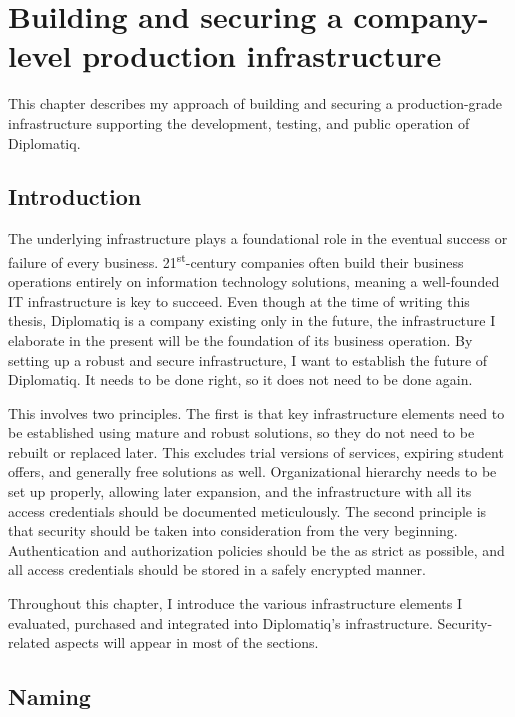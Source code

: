 \chapter{Building and securing a company-level production infrastructure}
\label{chapter:infrastructure}

This chapter describes my approach of building and securing a production-grade infrastructure supporting the development, testing, and public operation of Diplomatiq.

\section{Introduction}

The underlying infrastructure plays a foundational role in the eventual success or failure of every business. 21\textsuperscript{st}-century companies often build their business operations entirely on information technology solutions, meaning a well-founded IT infrastructure is key to succeed. Even though at the time of writing this thesis, Diplomatiq is a company existing only in the future, the infrastructure I elaborate in the present will be the foundation of its business operation. By setting up a robust and secure infrastructure, I want to establish the future of Diplomatiq. It needs to be done right, so it does not need to be done again.

This involves two principles. The first is that key infrastructure elements need to be established using mature and robust solutions, so they do not need to be rebuilt or replaced later. This excludes trial versions of services, expiring student offers, and generally free solutions as well. Organizational hierarchy needs to be set up properly, allowing later expansion, and the infrastructure with all its access credentials should be documented meticulously. The second principle is that security should be taken into consideration from the very beginning. Authentication and authorization policies should be the as strict as possible, and all access credentials should be stored in a safely encrypted manner.

Throughout this chapter, I introduce the various infrastructure elements I evaluated, purchased and integrated into Diplomatiq's infrastructure. Security-related aspects will appear in most of the sections.

\section{Naming}
\label{section:naming}

